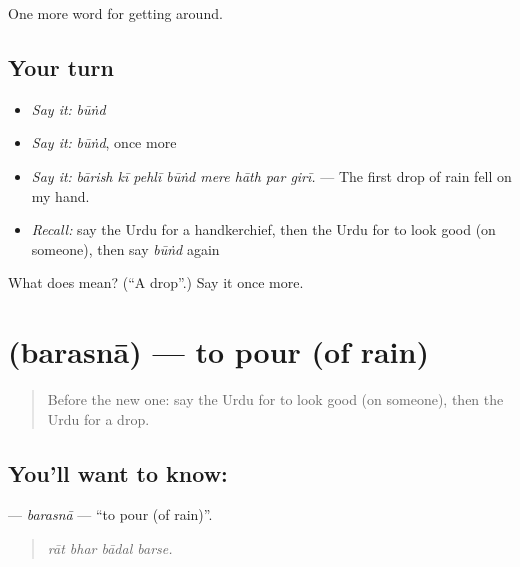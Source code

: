 \begin{grammarlens}[title={What you've built}]
One more word for getting around.
\end{grammarlens}

\subsection*{Your turn}
\begin{itemize}
\raggedright
  \item \emph{Say it:} \emph{būṅd}
  \item \emph{Say it:} \emph{būṅd}, once more
  \item \emph{Say it:} \emph{bārish kī pehlī būṅd mere hāth par girī.} — The first drop of rain fell on my hand.
  \item \emph{Recall:} say the Urdu for a handkerchief, then the Urdu for to look good (on someone), then say \emph{būṅd} again
\end{itemize}

\begin{tcolorbox}[breakable,colback=teal!4,colframe=teal!35!black,title={Before you move on}]
What does  mean? (\textquotedblleft{}A drop\textquotedblright{}.) Say it once more.
\end{tcolorbox}
\section[\texorpdfstring{\ur{برسنا} (barasnā)}{برسنا (barasnā)}]{ (barasnā) — to pour (of rain)}

\label{lesson:UR-C428-barasna}



\begin{quote}
Before the new one: say the Urdu for to look good (on someone), then the Urdu for a drop.
\end{quote}

\subsection*{You'll want to know: }
\textbf{} — \emph{barasnā} — \textquotedblleft{}to pour (of rain)\textquotedblright{}.

\begin{quote}
   
\end{quote}

\begin{quote}
\emph{rāt bhar bādal barse.}
\end{quote}

